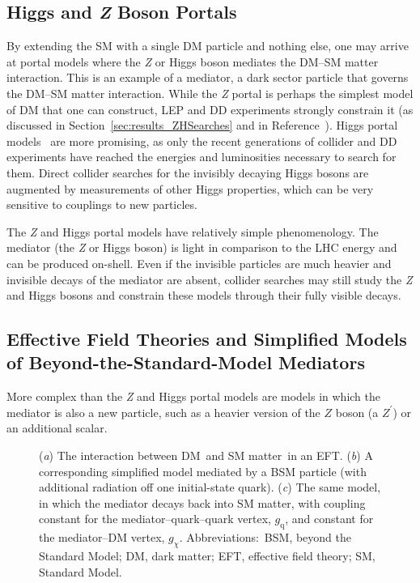 \documentclass{ar-1col}
\newcommand{\chiDM}{\ensuremath{\chi}\xspace}
\newcommand{\IP}{invisible particle}
\newcommand{\gDM}{\ensuremath{g_{\chiDM}}\xspace}
\newcommand{\gdm}{\gDM}
\newcommand{\gq}{$g_{\mathrm{q}}$\xspace}
\begin{document}
\subsection{Higgs and {\bf \it{Z}} Boson Portals}\label{sec:HZPortalModels}

By extending the SM with a single DM particle and nothing else, one
may arrive at portal models where the \textit{Z} or Higgs boson mediates
the DM--SM matter interaction. This is an example of a {mediator}, a dark sector particle that governs the DM--SM
matter interaction. While the {\textit{Z} portal} is perhaps the simplest
model of DM that one can construct, LEP and DD
experiments strongly constrain it (as discussed in
Section~\ref{sec:results_ZHSearches} and
in Reference~). {Higgs portal}
models~\cite{Patt:2006fw,Djouadi:2011aa} are more promising, as
only the recent generations of collider and DD
experiments have reached the energies and luminosities necessary to
search for them. Direct collider searches for the
invisibly decaying Higgs bosons are augmented by measurements of
other Higgs properties, which can be very sensitive to couplings
to new particles.

The \textit{Z} and Higgs portal models have relatively simple
phenomenology. The mediator (the \textit{Z} or Higgs boson) is light in
comparison to the LHC energy and can be produced on-shell. Even if
the {\IP}s are much heavier and invisible decays of the mediator
are absent, collider searches may still study the \textit{Z} and Higgs bosons and
constrain these models through their fully visible decays.

\subsection{Effective Field Theories and Simplified Models of Beyond-the-Standard-Model Mediators}\label{sec:BSMMediatorModels}

More complex than the \textit{Z} and Higgs portal
models are models in which the mediator is also a new particle, such
as a heavier version of the $Z$ boson (a $Z^\prime$) or an
additional scalar.

\begin{figure}[!htpb]
\caption{(\textit{a}) The interaction between DM\ and SM matter\ in an EFT. (\textit{b}) A corresponding simplified model mediated
by a BSM particle (with additional radiation off one initial-state
quark). (\textit{c}) The same model, in which  the mediator decays back into
SM matter, with coupling constant for the mediator--quark--quark vertex,
\gq, and constant for the mediator--DM vertex, \gdm. Abbreviations:\ BSM, beyond the Standard Model; DM, dark matter; EFT, effective field theory; SM, Standard Model.}
\label{fig:monoX}
\end{figure}
\end{document}
